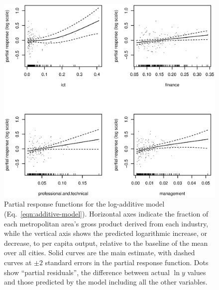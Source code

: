 \documentclass{pnastwo}
\begin{document}
\begin{figure}
\includegraphics{partial-response-functions}
  \caption{Partial response functions for the log-additive model (Eq.\
    \ref{eqn:additive-model}).  Horizontal axes indicate the fraction of each
    metropolitan area's gross product derived from each industry, while the
    vertical axis shows the predicted logarithmic increase, or decrease, to per
    capita output, relative to the baseline of the mean over all cities.  Solid
    curves are the main estimate, with dashed curves at $\pm 2$ standard errors
    in the partial response function.  Dots show ``partial residuals'', the
    difference between actual $\ln{y}$ values and those predicted by the model
    including all the other variables.}
\label{fig:partial-response-functions}
\end{figure}
\end{document}
